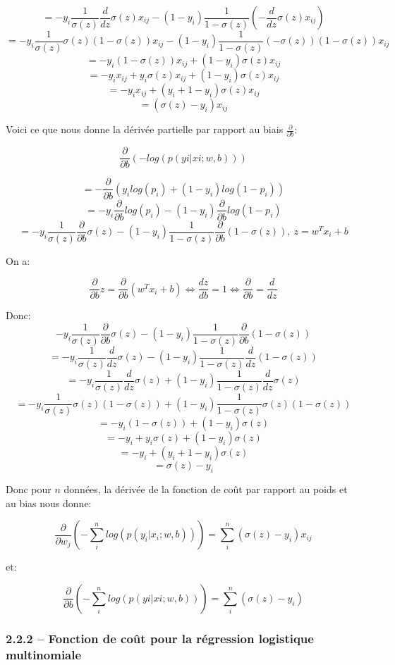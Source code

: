 \documentclass[
]{article}
\begin{document}
\[=-y_i \frac{1}{\sigma (z)}\frac{d}{dz}\sigma (z)x_{ij} - (1 - y_i)\frac{1}{1 - \sigma (z)}\left(-\frac{d}{dz} \sigma (z)x_{ij}\right)\]
\[=-y_i \frac{1}{\sigma (z)}\sigma (z) (1 - \sigma (z)) x_{ij} - (1 - y_i)\frac{1}{1 - \sigma (z)}(- \sigma (z))(1 - \sigma(z))x_{ij}\]
\[=-y_i (1 - \sigma (z)) x_{ij} + (1 - y_i)\sigma (z)x_{ij}\]
\[=-y_i x_{ij} + y_i \sigma (z) x_{ij} + (1 - y_i)\sigma (z)x_{ij}\]
\[=-y_i x_{ij} + (y_i + 1 - y_i)\sigma (z)x_{ij}\]
\[=(\sigma(z) - y_i)x_{ij}\]

Voici ce que nous donne la dérivée partielle par rapport au biais
\(\frac{\partial}{\partial b}\):

\[\frac{\partial}{\partial b}\left(-log(p(yi|xi;w,b))\right)\]

\[=-\frac{\partial}{\partial b}(y_i log(p_i) + (1 - y_i)log(1 - p_i))\]
\[=-y_i \frac{\partial}{\partial b}log(p_i) - (1 - y_i)\frac{\partial}{\partial b}log(1 - p_i)\]
\[=-y_i \frac{1}{\sigma (z)}\frac{\partial}{\partial b} \sigma(z) - (1 - y_i) \frac{1}{1 - \sigma (z)} \frac{\partial}{\partial b}(1 - \sigma (z)),\ z = w^T x_i + b\]

On a:

\[\frac{\partial}{\partial b} z = \frac{\partial}{\partial b}(w^T x_i + b) \Leftrightarrow \frac{dz}{db} = 1 \Leftrightarrow \frac{\partial}{\partial b} = \frac{d}{dz}\]

Donc:
\[-y_i \frac{1}{\sigma (z)}\frac{\partial}{\partial b} \sigma(z) - (1 - y_i) \frac{1}{1 - \sigma (z)} \frac{\partial}{\partial b}(1 - \sigma (z))\]
\[=-y_i \frac{1}{\sigma (z)}\frac{d}{dz} \sigma(z) - (1 - y_i) \frac{1}{1 - \sigma (z)} \frac{d}{dz}(1 - \sigma (z))\]
\[=-y_i \frac{1}{\sigma (z)}\frac{d}{dz} \sigma(z) + (1 - y_i) \frac{1}{1 - \sigma (z)} \frac{d}{dz}\sigma (z)\]
\[=-y_i \frac{1}{\sigma (z)}\sigma(z) (1 - \sigma (z)) + (1 - y_i) \frac{1}{1 - \sigma (z)} \sigma (z)(1 - \sigma (z))\]
\[=-y_i (1 - \sigma (z)) + (1 - y_i)\sigma (z)\]
\[=-y_i + y_i \sigma (z) + (1 - y_i)\sigma (z)\]
\[=-y_i + (y_i + 1 - y_i)\sigma (z)\] \[=\sigma (z) - y_i\]

Donc pour \(n\) données, la dérivée de la fonction de coût par rapport
au poids et au bias nous donne:

\[\frac{\partial}{\partial w_j}\left( - \sum_i^n log(p(y_i|x_i;w,b))\right) = \sum_i^n(\sigma(z) - y_i)x_{ij}\]

et:

\[\frac{\partial}{\partial b}\left(- \sum_i^n log(p(yi|xi;w,b))\right) = \sum_i^n (\sigma (z) - y_i)\]

\hypertarget{fonction-de-couxfbt-pour-la-ruxe9gression-logistique-multinomiale}{%
\subsubsection{2.2.2 -- Fonction de coût pour la régression logistique
multinomiale}\label{fonction-de-couxfbt-pour-la-ruxe9gression-logistique-multinomiale}}
\end{document}
